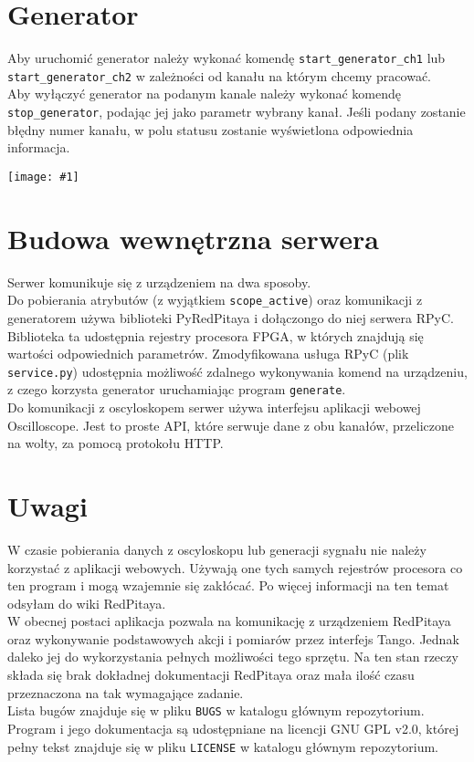 \documentclass[12pt,a4paper]{article}
\newcommand{\screenshot}[1]{\begin{minipage}[c]{\textwidth}\texttt{[image: \#1]}\end{minipage}}
\begin{document}
	\section{Generator}
	Aby uruchomić generator należy wykonać komendę \texttt{start\_generator\_ch1} lub \texttt{start\_generator\_ch2} w zależności od kanału na którym chcemy pracować.\\
	Aby wyłączyć generator na podanym kanale należy wykonać komendę \texttt{stop\_generator}, podając jej jako parametr wybrany kanał.
	Jeśli podany zostanie błędny numer kanału, w polu statusu zostanie wyświetlona odpowiednia informacja.\\
	\screenshot{screenshots/invalid_generator_channel.png}

	\section{Budowa wewnętrzna serwera}
	Serwer komunikuje się z urządzeniem na dwa sposoby.\\
	Do pobierania atrybutów (z wyjątkiem \texttt{scope\_active}) oraz komunikacji z generatorem używa biblioteki PyRedPitaya i dołączongo do niej serwera RPyC.
	Biblioteka ta udostępnia rejestry procesora FPGA, w których znajdują się wartości odpowiednich parametrów.
	Zmodyfikowana usługa RPyC (plik \texttt{service.py}) udostępnia możliwość zdalnego wykonywania komend na urządzeniu, z czego korzysta generator uruchamiając program \texttt{generate}.\\
	Do komunikacji z oscyloskopem serwer używa interfejsu aplikacji webowej Oscilloscope. Jest to proste API, które serwuje dane z obu kanałów, przeliczone na wolty, za pomocą protokołu HTTP.

	\section{Uwagi}
	W czasie pobierania danych z oscyloskopu lub generacji sygnału nie należy korzystać z aplikacji webowych. Używają one tych samych rejestrów procesora co ten program i mogą wzajemnie się zakłócać. Po więcej informacji na ten temat odsyłam do wiki RedPitaya.\\
	W obecnej postaci aplikacja pozwala na komunikację z urządzeniem RedPitaya oraz wykonywanie podstawowych akcji i pomiarów przez interfejs Tango.
	Jednak daleko jej do wykorzystania pełnych możliwości tego sprzętu. Na ten stan rzeczy składa się brak dokładnej dokumentacji RedPitaya oraz mała ilość czasu przeznaczona na tak wymagające zadanie.\\
	Lista bugów znajduje się w pliku \texttt{BUGS} w katalogu głównym repozytorium.\\
	Program i jego dokumentacja są udostępniane na licencji GNU GPL v2.0, której pełny tekst znajduje się w pliku \texttt{LICENSE} w katalogu głównym repozytorium. 
\end{document}
